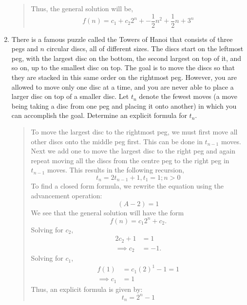 \documentclass[letter]{article}
\begin{document}
\begin{enumerate}
\begin{quote}
		    Thus, the general solution will be,
		    \[
		        f(n) =  c_1 + c_2 2^n + -\frac{1}{2}n^2 + \frac{1}{2}n + 3^n 
		    \]
		\end{quote}
		
		\newpage
        \item 
        There is a famous puzzle called the Towers of Hanoi that consists of three pegs and $n$ circular discs, all of different sizes. The discs start on the leftmost peg, with the largest disc on the bottom, the second largest on top of it, and so on, up to the smallest disc on top. The goal is to move the discs so that they are stacked in this same order on the rightmost peg. However, you are allowed to move only one disc at a time, and you are never able to place a larger disc on top of a smaller disc. Let $t_n$ denote the fewest moves (a move being taking a disc from one peg and placing it onto another) in which you can accomplish the goal. Determine an explicit formula for $t_n$.
		\begin{quote}
		    To move the largest disc to the rightmost peg, we must first move all other discs onto the middle peg first. This can be done in $t_{n-1}$ moves. Next we add one to move the largest disc to the right peg and again repeat moving all the discs from the centre peg to the right peg in $t_{n-1}$ moves. This results in the following recursion,
		    \[
		        t_n = 2t_{n-1} + 1, t_1 = 1; n > 0
		    \]
		    To find a closed form formula, we rewrite the equation using the advancement operation:
		    \[
		        (A -2) =1
		    \]
		    We see that the general solution will have the form 
		    \[
		        f(n) = c_1 2^n + c_2.
	        \]
	        Solving for $c_2$,
		    \begin{align*}
   		        2c_2 + 1  &= 1 \\
		        \implies c_2 &= -1.  
		    \end{align*}
		    Solving for $c_1$,
		    \begin{align*}
		       f(1) &=  c_1(2)^1 -1 = 1\\
		        \implies c_1 &= 1
		    \end{align*}
		    Thus, an explicit formula is given by:
		    \[
		        t_n = 2^n -1
		    \]
		
		
		\end{quote}
    \end{enumerate}
\end{document}
